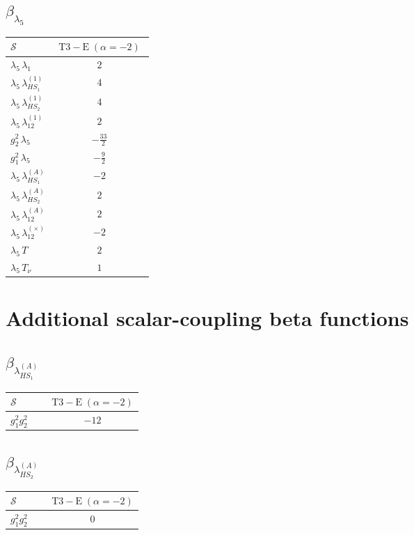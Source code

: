 \documentclass[9pt]{article}
\begin{document}
\subsection*{$ \beta_{\lambda_5} $}
\begin{longtable}{@{}p{0.31\linewidth}c@{}}
\toprule
$\mathcal{S}$ & $ \mathrm{T3-E}\;(\alpha=-2) $ \\
\midrule
$ \lambda_5\,\lambda_1 $ & $ 2 $ \\
$ \lambda_5\,\lambda_{HS_1}^{(1)} $ & $ 4 $ \\
$ \lambda_5\,\lambda_{HS_2}^{(1)} $ & $ 4 $ \\
$ \lambda_5\,\lambda_{12}^{(1)} $ & $ 2 $ \\
$ g_2^2\,\lambda_5 $ & $ - \frac{33}{2} $ \\
$ g_1^2\,\lambda_5 $ & $ - \frac{9}{2} $ \\
$ \lambda_5\,\lambda_{HS_1}^{(A)} $ & $ -2 $ \\
$ \lambda_5\,\lambda_{HS_2}^{(A)} $ & $ 2 $ \\
$ \lambda_5\,\lambda_{12}^{(A)} $ & $ 2 $ \\
$ \lambda_5\,\lambda_{12}^{(\times)} $ & $ -2 $ \\
$ \lambda_5\,T $ & $ 2 $ \\
$ \lambda_5\,T_\nu $ & $ 1 $ \\
\bottomrule
\end{longtable}
\section*{Additional scalar-coupling beta functions}
\subsection*{$ \beta_{\lambda_{HS_1}^{(A)}} $}
\begin{longtable}{@{}p{0.31\linewidth}c@{}}
\toprule
$\mathcal{S}$ & $ \mathrm{T3-E}\;(\alpha=-2) $ \\
\midrule
$ g_1^2g_2^2 $ & $ -12 $ \\
\bottomrule
\end{longtable}
\subsection*{$ \beta_{\lambda_{HS_2}^{(A)}} $}
\begin{longtable}{@{}p{0.31\linewidth}c@{}}
\toprule
$\mathcal{S}$ & $ \mathrm{T3-E}\;(\alpha=-2) $ \\
\midrule
$ g_1^2g_2^2 $ & $ 0 $ \\
\bottomrule
\end{longtable}
\end{document}
